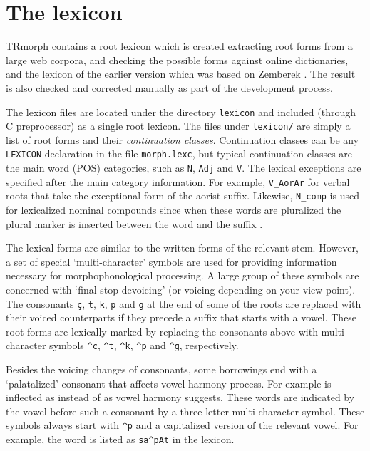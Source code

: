 \documentclass[twocolumn]{article}
\begin{document}
\section{\label{sec:lexicon}The lexicon}

TRmorph contains a root lexicon which is created extracting root forms
from a large web corpora, and checking the possible forms against
online dictionaries, and the lexicon of the earlier version which was
based on Zemberek \parencite{akin2007}. The result is also checked and
corrected manually as part of the development process. 

The lexicon files are located under the directory \lstinline{lexicon}
and included (through C preprocessor) as a single root lexicon. The
files under \lstinline{lexicon/} are simply a list of root forms and
their \emph{continuation classes}. Continuation classes can be any
\lstinline{LEXICON} declaration in the file \lstinline{morph.lexc},
but typical continuation classes are the main word (POS) categories,
such as \texttt{N}, \texttt{Adj} and \texttt{V}. The lexical
exceptions are specified after the main category information. For
example, \texttt{V\_AorAr} for verbal roots that take the exceptional
 form of the aorist suffix. Likewise, \texttt{N\_comp} is
used for lexicalized nominal  compounds since when these
words are pluralized the plural marker is inserted between the word
and the suffix .

The lexical forms are similar to the written forms of the relevant
stem. However, a set of special `multi-character' symbols are used for
providing information necessary for morphophonological processing.  A
large group of these symbols are concerned with `final stop devoicing'
(or voicing depending on your view point). The consonants \texttt{ç},
\texttt{t}, \texttt{k}, \texttt{p} and \texttt{g} at the end of some
of the roots are replaced with their voiced counterparts if they
precede a suffix that starts with a vowel. These root forms are
lexically marked by replacing the consonants above with
multi-character symbols \texttt{\^{}c}, \texttt{\^{}t}, \texttt{\^{}k},
\texttt{\^{}p} and \texttt{\^{}g}, respectively. 


Besides the voicing changes of consonants, some borrowings end with a
`palatalized' consonant that affects vowel harmony process. For
example  is inflected as
 instead of  as vowel harmony
suggests. These words are indicated by the vowel before such a
consonant by a three-letter multi-character symbol. These symbols
always start with \texttt{\^{}p} and a capitalized version of the
relevant vowel. For example, the word  is listed as
\texttt{sa\^{}pAt} in the lexicon.
\end{document}
